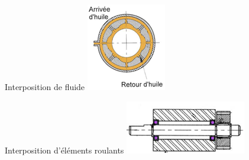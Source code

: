 \documentclass[11pt,oneside]{article}
\begin{document}
\begin{minipage}[t]{.23\linewidth}
\begin{center}
Interposition de fluide
\includegraphics[width=.9\textwidth]{png/fig08}
\end{center}
\end{minipage}\hfill
\begin{minipage}[t]{.23\linewidth}
\begin{center}
Interposition d'éléments roulants
\includegraphics[width=.9\textwidth]{png/fig09}
\end{center}
\end{minipage}
\end{document}
